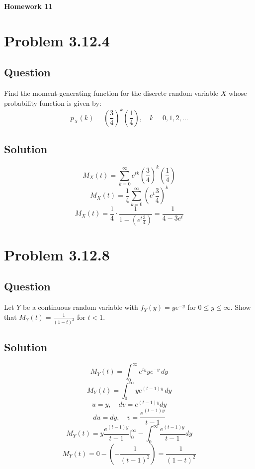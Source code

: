 \documentclass[12pt]{article}
\begin{document}
\begin{center}
  \Large \textbf{Homework 11}
\end{center}

\section*{Problem 3.12.4}
\subsection*{Question}
Find the moment-generating function for the discrete random variable \(X\) whose probability function is given by:
\[
  p_X(k) = \left(\frac{3}{4}\right)^k \left(\frac{1}{4}\right), \quad k=0,1,2,\dots
\]

\subsection*{Solution}
\[
  M_X(t) = \sum_{k=0}^\infty e^{tk} \left(\frac{3}{4}\right)^k \left(\frac{1}{4}\right)
\]
\[
  M_X(t) = \frac{1}{4} \sum_{k=0}^\infty \left(e^t \frac{3}{4}\right)^k
\]
\[
  M_X(t) = \frac{1}{4} \cdot \frac{1}{1 - \left(e^t \frac{3}{4}\right)} = \frac{1}{4 - 3e^t}
\]
\pagebreak

\section*{Problem 3.12.8}
\subsection*{Question}
Let \(Y\) be a continuous random variable with \(f_Y(y) = ye^{-y}\) for \(0 \leq y \leq \infty\). Show that \(M_Y(t) = \frac{1}{(1-t)^2}\) for \(t < 1\).

\subsection*{Solution}
\[
  M_Y(t) = \int_0^\infty e^{ty} y e^{-y} \, dy
\]
\[
  M_Y(t) = \int_0^\infty y e^{(t-1)y} \, dy
\]
\[
  u = y, \quad dv = e^{(t-1)y} dy
\]
\[
  du = dy, \quad v = \frac{e^{(t-1)y}}{t-1}
\]
\[
  M_Y(t) = y \frac{e^{(t-1)y}}{t-1} \bigg|_0^\infty - \int_0^\infty \frac{e^{(t-1)y}}{t-1} dy
\]
\[
  M_Y(t) = 0 - \left(-\frac{1}{(t-1)^2}\right) = \frac{1}{(1-t)^2}
\]
\pagebreak
\end{document}

